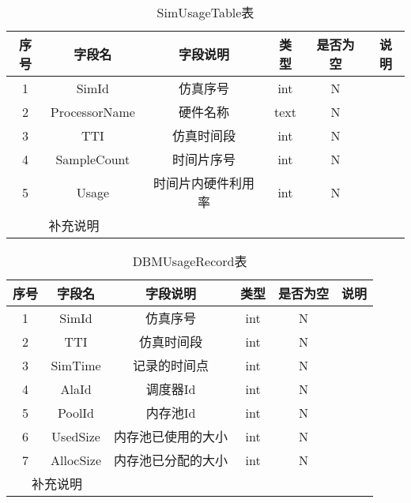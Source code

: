 \begin{table}[!h]
    \centering\normalsize
    \caption{SimUsageTable表}
    \begin{tabular}{|c|c|c|c|c|c|}
    \hline
    \textbf{序号} & \textbf{字段名}  & \textbf{字段说明} & \textbf{类型} & \textbf{是否为空} & \textbf{说明} \\ \hline
    1           & SimId         & 仿真序号          & int         & N             &             \\ \hline
    2           & ProcessorName & 硬件名称          & text        & N             &             \\ \hline
    3           & TTI           & 仿真时间段         & int         & N             &             \\ \hline
    4           & SampleCount   & 时间片序号         & int         & N             &             \\ \hline
    5           & Usage         & 时间片内硬件利用率     & int         & N             &             \\ \hline
    \multicolumn{2}{|c|}{补充说明} &               &             &               &             \\ \hline
    \end{tabular}
    \end{table}

\begin{table}[!h]
    \centering\normalsize
    \caption{DBMUsageRecord表}
    \begin{tabular}{|c|c|c|c|c|c|}
    \hline
    \textbf{序号} & \textbf{字段名} & \textbf{字段说明} & \textbf{类型} & \textbf{是否为空} & \textbf{说明} \\ \hline
    1           & SimId        & 仿真序号          & int         & N             &             \\ \hline
    2           & TTI          & 仿真时间段         & int         & N             &             \\ \hline
    3           & SimTime      & 记录的时间点        & int         & N             &             \\ \hline
    4           & AlaId        & 调度器Id         & int         & N             &             \\ \hline
    5           & PoolId       & 内存池Id         & int         & N             &             \\ \hline
    6           & UsedSize     & 内存池已使用的大小     & int         & N             &             \\ \hline
    7           & AllocSize    & 内存池已分配的大小     & int         & N             &             \\ \hline
    \multicolumn{2}{|c|}{补充说明} &               &             &               &             \\ \hline
    \end{tabular}
    \end{table}

